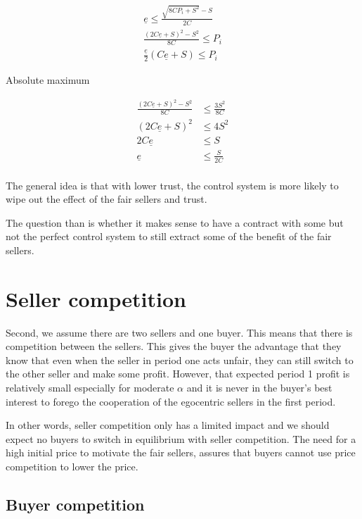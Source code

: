 \documentclass{article}
\begin{document}
\begin{align*}
\underline{e} \leq \frac{\sqrt{8CP_i + S^2} - S}{2C} \\
\frac{(2C \underline{e} + S)^2 - S^2}{8C} \leq P_i \\
\frac{\underline{e}}{2} (C \underline{e} + S) \leq P_i
\end{align*}

Absolute maximum

\begin{align*}
\frac{(2C \underline{e} + S)^2 - S^2}{8C} &\leq \frac{3S^2}{8C} \\
(2C \underline{e} + S)^2 &\leq 4 S^2 \\
2C \underline{e} &\leq S \\
\underline{e} &\leq \frac{S}{2C} \\
\end{align*}

The general idea is that with lower trust, the control system is more likely to wipe out the effect of the fair sellers and trust. 

The question than is whether it makes sense to have a contract with some but not the perfect control system to still extract some of the benefit of the fair sellers. 

\section{Seller competition}

Second, we assume there are two sellers and one buyer. This means that there is competition between the sellers. This gives the buyer the advantage that they know that even when the seller in period one acts unfair, they can still switch to the other seller and make some profit. However, that expected period 1 profit is relatively small especially for moderate $\alpha$ and it is never in the buyer's best interest to forego the cooperation of the egocentric sellers in the first period. 

In other words, seller competition only has a limited impact and we should expect no buyers to switch in equilibrium with seller competition. The need for a high initial price to motivate the fair sellers, assures that buyers cannot use price competition to lower the price. 

\subsection{Buyer competition}
\end{document}
